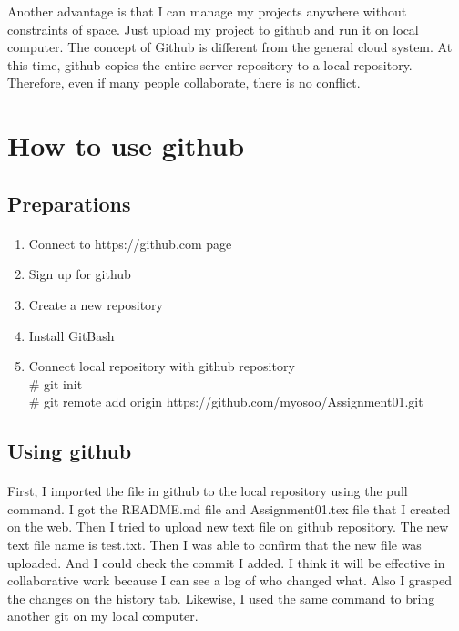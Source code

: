 \documentclass[12pt]{article}%
\begin{document}
Another advantage is that I can manage my projects anywhere without constraints of space. Just upload my project to github and run it on local computer. The concept of Github is different from the general cloud system. At this time, github copies the entire server repository to a local repository. Therefore, even if many people collaborate, there is no conflict.

\section{How to use github}
\subsection{Preparations}
\paragraph{}
\begin{enumerate}
\item Connect to https://github.com page
\item Sign up for github
\item Create a new repository
\item Install GitBash
\item Connect local repository with github repository\\
\# git init\\
\# git remote add origin https://github.com/myosoo/Assignment01.git\\

\end{enumerate}

\subsection{Using github}
\paragraph{}
First, I imported the file in github to the local repository using the pull command. I got the README.md file and Assignment01.tex file that I created on the web. Then I tried to upload new text file on github repository. The new text file name is test.txt. Then I was able to confirm that the new file was uploaded. And I could check the commit I added. I think it will be effective in collaborative work because I can see a log of who changed what. Also I grasped the changes on the history tab. Likewise, I used the same command to bring another git on my local computer. 
\end{document}
